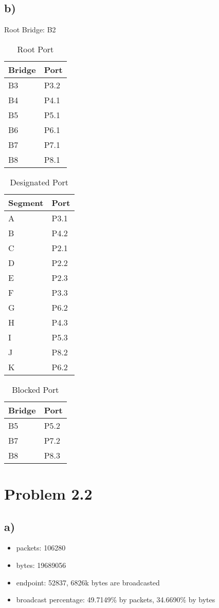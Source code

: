 \documentclass[11pt]{article}
\begin{document}
\subsection{b)}
\label{sec:orge85250d}
Root Bridge: B2
\begin{table}[htbp]
\caption{Root Port}
\centering
\begin{tabular}{ll}
Bridge & Port\\
\hline
B3 & P3.2\\
B4 & P4.1\\
B5 & P5.1\\
B6 & P6.1\\
B7 & P7.1\\
B8 & P8.1\\
\end{tabular}
\end{table}

\begin{table}[htbp]
\caption{Designated Port}
\centering
\begin{tabular}{ll}
Segment & Port\\
\hline
A & P3.1\\
B & P4.2\\
C & P2.1\\
D & P2.2\\
E & P2.3\\
F & P3.3\\
G & P6.2\\
H & P4.3\\
I & P5.3\\
J & P8.2\\
K & P6.2\\
\end{tabular}
\end{table}

\begin{table}[htbp]
\caption{Blocked Port}
\centering
\begin{tabular}{ll}
Bridge & Port\\
\hline
B5 & P5.2\\
B7 & P7.2\\
B8 & P8.3\\
\end{tabular}
\end{table}

\section{Problem 2.2}
\label{sec:org0fba1e3}
\subsection{a)}
\label{sec:org85c2a87}
\begin{itemize}
\item packets: 106280
\item bytes: 19689056

\item endpoint: 52837, 6826k bytes are broadcasted
\item broadcast percentage: 49.7149\% by packets, 34.6690\% by bytes
\end{itemize}
\end{document}
